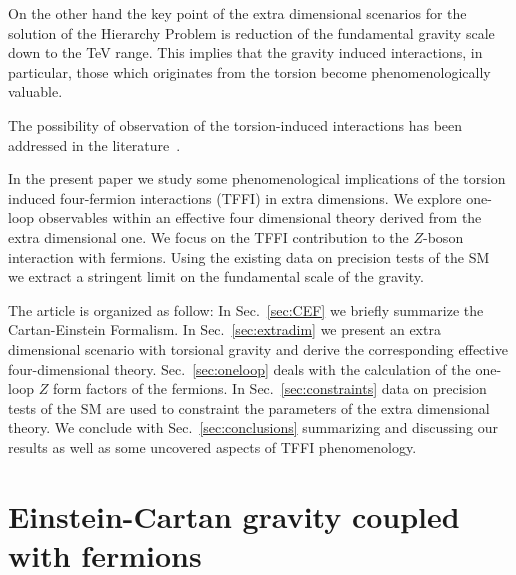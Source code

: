 \documentclass[twocolumn,showpacs,showkeys,prd,superscriptaddress]{revtex4-1}
\begin{document}
On the other hand the key point of the extra dimensional scenarios  \cite{ArkaniHamed:1998rs,Antoniadis:1998ig,ArkaniHamed:1998nn,Randall:1999ee,Randall:1999vf} for the solution of the Hierarchy Problem is reduction of the fundamental gravity scale down to the \si{\TeV} range.  This implies that the gravity induced  interactions, in particular, those which originates from the torsion become phenomenologically valuable.


The possibility of observation of the torsion-induced interactions has been addressed in the literature~\cite{Belyaev:1998ax,CastilloFelisola:2012fy,Lebedev:2002dp,Kostelecky:2007kx}.


In the present paper we study some phenomenological implications of the torsion induced four-fermion interactions (TFFI) in extra dimensions.
We explore one-loop observables within an effective four dimensional theory derived from the extra dimensional one. We focus on the TFFI contribution to the  $Z$-boson interaction with fermions. Using the existing data on precision tests of the SM~\cite{Altarelli:2004fq,Beringer:1900zz} we extract a stringent limit on the fundamental scale of the gravity. 

The article is organized as follow: In Sec.~\ref{sec:CEF}  we briefly summarize the Cartan-Einstein Formalism. In Sec.~\ref{sec:extradim}  we present an extra dimensional scenario with torsional gravity and derive the corresponding effective four-dimensional theory. Sec.~\ref{sec:oneloop} deals with the calculation of the one-loop $Z$ form factors of the fermions. In Sec.~\ref{sec:constraints} data on precision tests of the SM are used to constraint the parameters of the extra dimensional theory. We conclude with Sec.~\ref{sec:conclusions} summarizing and discussing our results as well as some uncovered aspects of TFFI phenomenology.


\section{\label{sec:CEF} Einstein-Cartan gravity coupled with fermions}
\end{document}

